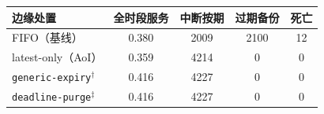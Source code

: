 \begin{tabular}{lcccc}
\toprule
边缘处置 & 全时段服务 & 中断按期 & 过期备份 & 死亡\\
\midrule
FIFO（基线） & 0.380 & 2009 & 2100 & 12\\
latest-only（AoI） & 0.359 & 4214 & 0 & 0\\
\texttt{generic-expiry}$^{\dagger}$ & 0.416 & 4227 & 0 & 0\\
\texttt{deadline-purge}$^{\ddagger}$ & 0.416 & 4227 & 0 & 0\\
\bottomrule
\end{tabular}
